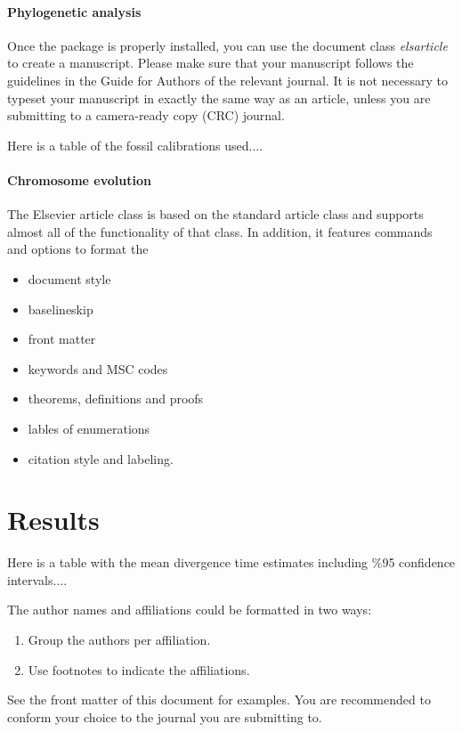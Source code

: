 \documentclass[review]{elsarticle}
\begin{document}
\paragraph{Phylogenetic analysis} Once the package is properly installed, you can use the document class \emph{elsarticle} to create a manuscript. Please make sure that your manuscript follows the guidelines in the Guide for Authors of the relevant journal. It is not necessary to typeset your manuscript in exactly the same way as an article, unless you are submitting to a camera-ready copy (CRC) journal.

Here is a table of the fossil calibrations used....

\paragraph{Chromosome evolution} The Elsevier article class is based on the standard article class and supports almost all of the functionality of that class. In addition, it features commands and options to format the
\begin{itemize}
\item document style
\item baselineskip
\item front matter
\item keywords and MSC codes
\item theorems, definitions and proofs
\item lables of enumerations
\item citation style and labeling.
\end{itemize}

\section{Results}

Here is a table with the mean divergence time estimates including \%95 confidence intervals....

The author names and affiliations could be formatted in two ways:
\begin{enumerate}[(1)]
\item Group the authors per affiliation.
\item Use footnotes to indicate the affiliations.
\end{enumerate}
See the front matter of this document for examples. You are recommended to conform your choice to the journal you are submitting to.
\end{document}
